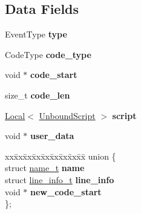 \subsection*{Data Fields}
\begin{DoxyCompactItemize}
\item 
\mbox{\label{structv8_1_1JitCodeEvent_ace1fbc4119ac3ef609d8e0f89cbc2c9f}} 
Event\+Type {\bfseries type}
\item 
\mbox{\label{structv8_1_1JitCodeEvent_afe160860a394de2db6d4de56d8f89e99}} 
Code\+Type {\bfseries code\+\_\+type}
\item 
\mbox{\label{structv8_1_1JitCodeEvent_aeeac614e6c125bf08bf785b070090d0f}} 
void $\ast$ {\bfseries code\+\_\+start}
\item 
\mbox{\label{structv8_1_1JitCodeEvent_ad56f78749d03f5db29ed417c2f3b4666}} 
size\+\_\+t {\bfseries code\+\_\+len}
\item 
\mbox{\label{structv8_1_1JitCodeEvent_a50ac4979f3d15900647b6b29dae3db76}} 
\mbox{\hyperlink{classv8_1_1Local}{Local}}$<$ \mbox{\hyperlink{classv8_1_1UnboundScript}{Unbound\+Script}} $>$ {\bfseries script}
\item 
\mbox{\label{structv8_1_1JitCodeEvent_a90597e06440ebd68fe582bd1361d6de6}} 
void $\ast$ {\bfseries user\+\_\+data}
\item 
\mbox{\label{structv8_1_1JitCodeEvent_ac9f1a97a0ec147b1bb78cb9498f1a0c3}} 
\begin{tabbing}
xx\=xx\=xx\=xx\=xx\=xx\=xx\=xx\=xx\=\kill
union \{\\
\>struct \mbox{\hyperlink{structv8_1_1JitCodeEvent_1_1name__t}{name\_t}} {\bfseries name}\\
\>struct \mbox{\hyperlink{structv8_1_1JitCodeEvent_1_1line__info__t}{line\_info\_t}} {\bfseries line\_info}\\
\>void $\ast$ {\bfseries new\_code\_start}\\
\}; \\

\end{tabbing}\end{DoxyCompactItemize}


